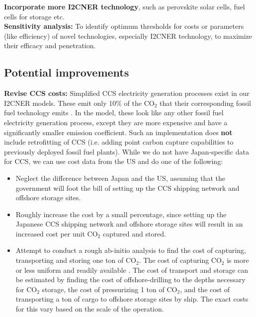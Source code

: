 \documentclass[14pt,a4paper]{article} %
\begin{document}
\textbf{Incorporate more \gls{I2CNER} technology}, such as perovskite solar cells, fuel cells for storage etc.\\

\textbf{Sensitivity analysis:} To identify optimum thresholds for costs or parameters (like efficiency) of novel technologies, especially \gls{I2CNER} technology, to maximize their efficacy and penetration.\\

\subsection{Potential improvements}

\textbf{Revise \gls{CCS} costs:} Simplified \gls{CCS} electricity generation processes exist in our \gls{I2CNER} models. These emit only 10\% of the CO$_2$ that their corresponding fossil fuel technology emits \cite{kato_energy_2016}. In the model, these look like any other fossil fuel electricity generation process, except they are more expensive and have a significantly smaller emission coefficient. Such an implementation does \textbf{not} include retrofitting of \gls{CCS} (i.e. adding point carbon capture capabilities to previously deployed fossil fuel plants). While we do not have Japan-specific data for \gls{CCS}, we can use cost data from the US and do one of the following:

\begin{itemize}

\item Neglect the difference between Japan and the US, assuming that the government will foot the bill of setting up the \gls{CCS} shipping network and offshore storage sites.

\item Roughly increase the cost by a small percentage, since setting up the Japanese \gls{CCS} shipping network and offshore storage sites will result in an increased cost per unit CO$_2$ captured and stored.

\item Attempt to conduct a rough ab-initio analysis to find the cost of capturing, transporting and storing one ton of CO$_2$. The cost of capturing CO$_2$ is more or less uniform and readily available \cite{kato_energy_2016}. The cost of transport and storage can be estimated by finding the cost of offshore-drilling to the depths necessary for CO$_2$ storage, the cost of pressurizing 1 ton of CO$_2$, and the cost of transporting a ton of cargo to offshore storage sites by ship. The exact costs for this vary based on the scale of the operation.

\end{itemize}
\end{document}

